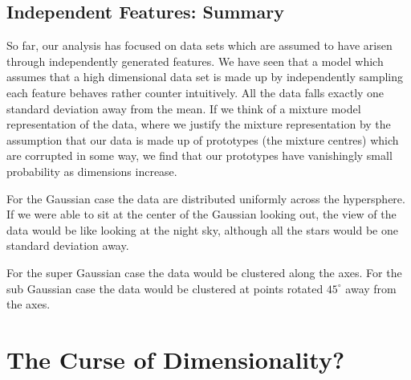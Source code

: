 \subsection{Independent Features: Summary}

So far, our analysis has focused on data sets which are assumed to
have arisen through independently generated features. We have seen
that a model which assumes that a high dimensional data set is made up
by independently sampling each feature behaves rather counter
intuitively. All the data falls exactly one standard deviation away
from the mean. If we think of a mixture model representation of the
data, where we justify the mixture representation by the assumption
that our data is made up of prototypes (the mixture centres) which are
corrupted in some way, we find that our prototypes have vanishingly
small probability as dimensions increase.

For the Gaussian case the data are distributed uniformly across the
hypersphere. If we were able to sit at the center of the Gaussian
looking out, the view of the data would be like looking at the night
sky, although all the stars would be one standard deviation away.  

  For
the super Gaussian case the data would be clustered along the
axes. For the sub Gaussian case the data would be clustered at points
rotated $45^{\circ}$ away from the axes.






\section{The Curse of Dimensionality?\label{sec:realWorldData}}


